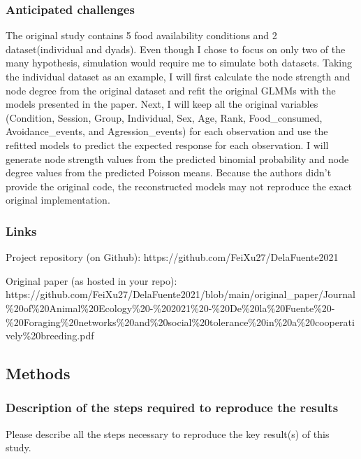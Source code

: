 \documentclass[
  letterpaper,
  DIV=11,
  numbers=noendperiod]{scrartcl}
\begin{document}
\subsubsection{Anticipated challenges}\label{anticipated-challenges}

The original study contains 5 food availability conditions and 2
dataset(individual and dyads). Even though I chose to focus on only two
of the many hypothesis, simulation would require me to simulate both
datasets. Taking the individual dataset as an example, I will first
calculate the node strength and node degree from the original dataset
and refit the original GLMMs with the models presented in the paper.
Next, I will keep all the original variables (Condition, Session, Group,
Individual, Sex, Age, Rank, Food\_consumed, Avoidance\_events, and
Agression\_events) for each observation and use the refitted models to
predict the expected response for each observation. I will generate node
strength values from the predicted binomial probability and node degree
values from the predicted Poisson means. Because the authors didn't
provide the original code, the reconstructed models may not reproduce
the exact original implementation.

\subsubsection{Links}\label{links}

Project repository (on Github):
https://github.com/FeiXu27/DelaFuente2021

Original paper (as hosted in your repo):
https://github.com/FeiXu27/DelaFuente2021/blob/main/original\_paper/Journal\%20of\%20Animal\%20Ecology\%20-\%202021\%20-\%20De\%20la\%20Fuente\%20-\%20Foraging\%20networks\%20and\%20social\%20tolerance\%20in\%20a\%20cooperatively\%20breeding.pdf

\subsection{Methods}\label{methods}

\subsubsection{Description of the steps required to reproduce the
results}\label{description-of-the-steps-required-to-reproduce-the-results}

Please describe all the steps necessary to reproduce the key result(s)
of this study.
\end{document}

